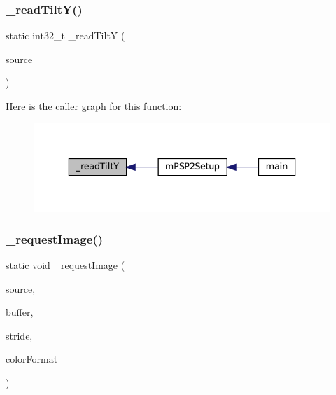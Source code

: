 \subsubsection{\texorpdfstring{\+\_\+read\+Tilt\+Y()}{\_readTiltY()}}
{\footnotesize\ttfamily static int32\+\_\+t \+\_\+read\+TiltY (\begin{DoxyParamCaption}\item[{struct m\+Rotation\+Source $\ast$}]{source }\end{DoxyParamCaption})\hspace{0.3cm}{\ttfamily [static]}}

Here is the caller graph for this function\+:
\nopagebreak
\begin{figure}[H]
\begin{center}
\leavevmode
\includegraphics[width=336pt]{psp2-context_8c_a483456c7f026a79ac8b6f9f6bb3349e3_icgraph}
\end{center}
\end{figure}
\mbox{\label{psp2-context_8c_afd6bb33399978f5ee1d82f3b905f8eec}} 
\subsubsection{\texorpdfstring{\+\_\+request\+Image()}{\_requestImage()}}
{\footnotesize\ttfamily static void \+\_\+request\+Image (\begin{DoxyParamCaption}\item[{struct m\+Image\+Source $\ast$}]{source,  }\item[{const void $\ast$$\ast$}]{buffer,  }\item[{size\+\_\+t $\ast$}]{stride,  }\item[{enum m\+Color\+Format $\ast$}]{color\+Format }\end{DoxyParamCaption})\hspace{0.3cm}{\ttfamily [static]}}

